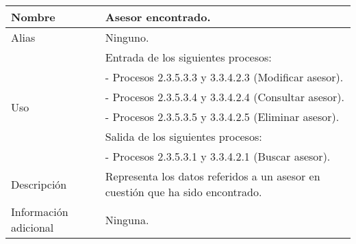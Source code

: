 \begin{center}
  \begin{tabular}{| l | p{9cm} |}
    \hline
    Nombre & \textbf{Asesor encontrado}.\\
    \hline
    Alias & Ninguno.\\
    \hline
    \multirow{6}{*}{Uso} & Entrada de los siguientes procesos:\\
                         & - Procesos 2.3.5.3.3 y 3.3.4.2.3 (Modificar asesor).\\
                         & - Procesos 2.3.5.3.4 y 3.3.4.2.4 (Consultar asesor).\\
                         & - Procesos 2.3.5.3.5 y 3.3.4.2.5 (Eliminar asesor).\\
                         & Salida de los siguientes procesos:\\
                         & - Procesos 2.3.5.3.1 y 3.3.4.2.1 (Buscar asesor).\\
    \hline
    Descripción & Representa los datos referidos a un asesor
                  en cuestión que ha sido encontrado.\\
    \hline
    Información adicional & Ninguna.\\
    \hline
  \end{tabular}
\end{center}
